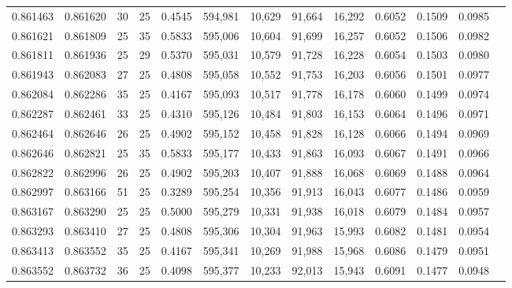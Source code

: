 \begin{tabular}{rrrrrrrrrrrrr}
0.861463 & 0.861620 &    30 &  25 &                                     0.4545 & 594,981 &  10,629 &  91,664 &  16,292 & 0.6052 & 0.1509 & 0.0985 \\
0.861621 & 0.861809 &    25 &  35 &                                     0.5833 & 595,006 &  10,604 &  91,699 &  16,257 & 0.6052 & 0.1506 & 0.0982 \\
0.861811 & 0.861936 &    25 &  29 &                                     0.5370 & 595,031 &  10,579 &  91,728 &  16,228 & 0.6054 & 0.1503 & 0.0980 \\
0.861943 & 0.862083 &    27 &  25 &                                     0.4808 & 595,058 &  10,552 &  91,753 &  16,203 & 0.6056 & 0.1501 & 0.0977 \\
0.862084 & 0.862286 &    35 &  25 &                                     0.4167 & 595,093 &  10,517 &  91,778 &  16,178 & 0.6060 & 0.1499 & 0.0974 \\
0.862287 & 0.862461 &    33 &  25 &                                     0.4310 & 595,126 &  10,484 &  91,803 &  16,153 & 0.6064 & 0.1496 & 0.0971 \\
0.862464 & 0.862646 &    26 &  25 &                                     0.4902 & 595,152 &  10,458 &  91,828 &  16,128 & 0.6066 & 0.1494 & 0.0969 \\
0.862646 & 0.862821 &    25 &  35 &                                     0.5833 & 595,177 &  10,433 &  91,863 &  16,093 & 0.6067 & 0.1491 & 0.0966 \\
0.862822 & 0.862996 &    26 &  25 &                                     0.4902 & 595,203 &  10,407 &  91,888 &  16,068 & 0.6069 & 0.1488 & 0.0964 \\
0.862997 & 0.863166 &    51 &  25 &                                     0.3289 & 595,254 &  10,356 &  91,913 &  16,043 & 0.6077 & 0.1486 & 0.0959 \\
0.863167 & 0.863290 &    25 &  25 &                                     0.5000 & 595,279 &  10,331 &  91,938 &  16,018 & 0.6079 & 0.1484 & 0.0957 \\
0.863293 & 0.863410 &    27 &  25 &                                     0.4808 & 595,306 &  10,304 &  91,963 &  15,993 & 0.6082 & 0.1481 & 0.0954 \\
0.863413 & 0.863552 &    35 &  25 &                                     0.4167 & 595,341 &  10,269 &  91,988 &  15,968 & 0.6086 & 0.1479 & 0.0951 \\
0.863552 & 0.863732 &    36 &  25 &                                     0.4098 & 595,377 &  10,233 &  92,013 &  15,943 & 0.6091 & 0.1477 & 0.0948 \\

\end{tabular}
